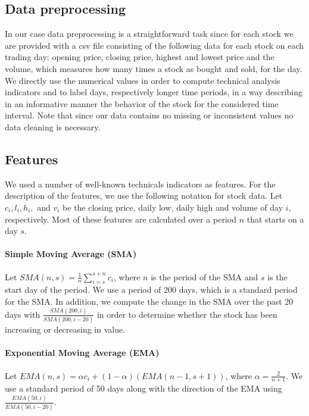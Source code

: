 \documentclass[10pt]{article}
\begin{document}
\subsection{Data preprocessing}
In our case data preprocessing is a straightforward task since for each stock
we are provided with a csv file consisting of the following data for each
stock on each trading day: opening price, closing price, highest and lowest
price and the volume, which measures how many times a stock as bought and sold,
for the day. We directly use the numerical values in order to compute technical
analysis indicators and to label days, respectively longer time periods, in a
way describing in an informative manner the behavior of the stock for the
considered time interval. Note that since our data contains no missing or
inconsistent values no data cleaning is necessary.

\subsection{Features}

We used a number of well-known technicals indicators as features. For the
description of the features, we use the following notation for stock data. Let
$c_i, l_i, h_i,$ and $v_i$ be the closing price, daily low, daily high and
volume of day $i$, respectively. Most of these features are calculated over a
period $n$ that starts on a day $s$.
\vspace{-0.35cm}

\paragraph{Simple Moving Average (SMA)} Let $SMA(n, s) =
\frac{1}{n}\sum_{i=s}^{s + n} c_i$, where $n$ is the period of the SMA and $s$
is the start day of the period. We use a period of 200 days, which is a
standard period for the SMA. In addition, we compute the change in the SMA over
the past 20 days with $\frac{SMA(200, i)}{SMA(200, i - 20)}$ in order to determine
whether the stock has been increasing or decreasing in value.
\vspace{-0.35cm}

\paragraph{Exponential Moving Average (EMA)} Let $EMA(n, s) = \alpha c_i + (1 -
\alpha)(EMA(n - 1, s + 1))$, where $\alpha = \frac{2}{n +
1}$. We use a standard period of 50 days along with the direction of
the EMA using $\frac{EMA(50, i)}{EMA(50, i - 20)}$.
\vspace{-0.35cm}
\end{document}
